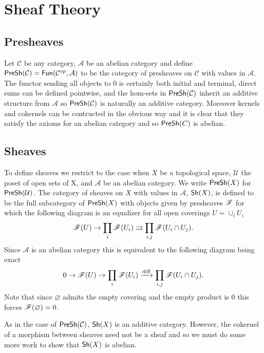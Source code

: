 \documentclass{memoir}
\begin{document}
\chapter{Sheaf Theory}
\label{ch:sheafs}
\section{Presheaves}
Let $\mathcal C$ be any category, $\mathcal A$ be an abelian category and define ${\normalfont\mathsf{PreSh}}(\mathcal C) = {\normalfont\mathsf{Fun}}(\mathcal C^{op},\mathcal A)$ to be the category of presheaves on $\mathcal C$ with values in $\mathcal A$.
The functor sending all objects to $0$ is certainly both initial and terminal, direct sums can be defined pointwise, and the hom-sets in ${\normalfont\mathsf{PreSh}}(\mathcal C)$ inherit an additive structure from $\mathcal A$ so ${\normalfont\mathsf{PreSh}}(\mathcal C)$ is naturally an additive category.
Moreover kernels and cokernels can be contructed in the obvious way and it is clear that they satisfy the axioms for an abelian category and so ${\normalfont\mathsf{PreSh}}(C)$ is abelian.
\section{Sheaves}
To define sheaves we restrict to the case when $X$ be a topological space, $\mathcal U$ the poset of open sets of X, and $\mathcal A$ be an abelian category.
We write ${\normalfont\mathsf{PreSh}}(X)$ for ${\normalfont\mathsf{PreSh}}(\mathcal U)$.
The category of sheaves on $X$ with values in $\mathcal A$, ${\normalfont\mathsf{Sh}}(X)$, is defined to be the full subcategory of ${\normalfont\mathsf{PreSh}}(X)$ with objects given by presheaves $\mathscr{F}$ for which the following diagram is an equalizer for all open coverings $U = \cup_i U_i$
\begin{equation}
\mathscr{F}(U)\rightarrow \prod_i \mathscr{F}(U_i) \rightrightarrows \prod_{i,j} \mathscr{F}(U_i\cap U_j).
\end{equation}
Since $\mathcal A$ is an abelian category this is equivalent to the following diagram being exact
\begin{equation}
0\rightarrow \mathscr{F}(U)\rightarrow \prod_i \mathscr{F}(U_i) \xrightarrow[]{\text{diff}} \prod_{i,j} \mathscr{F}(U_i\cap U_j).
\end{equation}
Note that since $\varnothing$ admits the empty covering and the empty product is $0$ this forces $\mathscr{F}(\varnothing) = 0$.

As in the case of ${\normalfont\mathsf{PreSh}}(\mathcal C)$, ${\normalfont\mathsf{Sh}}(X)$ is an additive category.
However, the cokernel of a morphism between sheaves need not be a sheaf and so we must do some more work to show that ${\normalfont\mathsf{Sh}}(X)$ is abelian.
\end{document}
